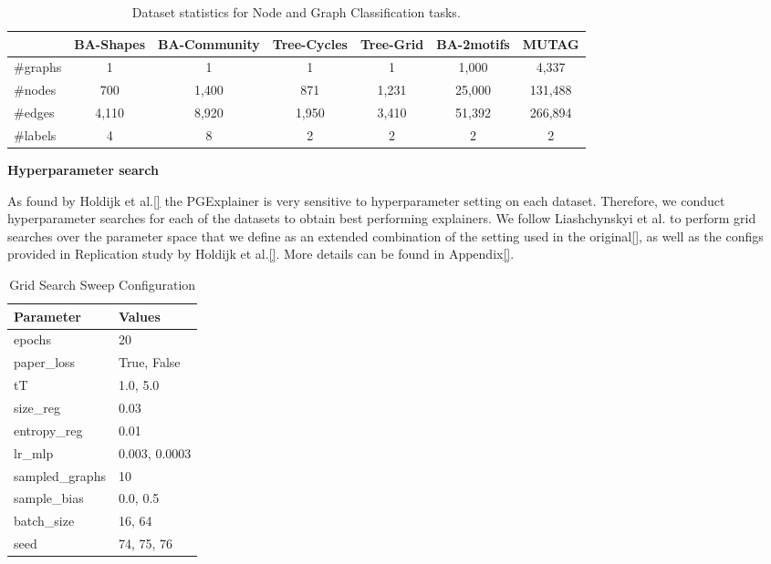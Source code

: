 \begin{table}[h]
    \centering
    \scriptsize
    \begin{tabular}{l|cccc|cc}
    \hline
    \textbf{} & \textbf{BA-Shapes} & \textbf{BA-Community} & \textbf{Tree-Cycles} & \textbf{Tree-Grid} & \textbf{BA-2motifs} & \textbf{MUTAG} \\
    \hline
    \#graphs & 1 & 1 & 1 & 1 & 1,000 & 4,337 \\
    \#nodes  & 700 & 1,400 & 871 & 1,231 & 25,000 & 131,488 \\
    \#edges  & 4,110 & 8,920 & 1,950 & 3,410 & 51,392 & 266,894 \\
    \#labels & 4 & 8 & 2 & 2 & 2 & 2 \\
    \hline
    \end{tabular}
    \caption{Dataset statistics for Node and Graph Classification tasks.}
    \label{tab:dataset-statistics}
    \end{table}

\bigskip


\textbf{Hyperparameter search}

As found by Holdijk et al.\ref{} the PGExplainer is very sensitive to hyperparameter setting on each dataset. Therefore, we conduct hyperparameter searches for each of the datasets to obtain best performing explainers. We follow Liashchynskyi et al. \cite{liashchynskyi2019grid} to perform grid searches over the parameter space that we define as an extended combination of the setting used in the original\ref{}, as well as the configs provided in Replication study by Holdijk et al.\ref{}. More details can be found in Appendix\ref{}.

\begin{table}[h!]
    \centering
    \begin{tabular}{|l|l|}
    \hline
    \textbf{Parameter} & \textbf{Values} \\ \hline
    epochs & 20 \\ \hline
    paper\_loss & True, False \\ \hline
    tT & 1.0, 5.0 \\ \hline
    size\_reg & 0.03 \\ \hline
    entropy\_reg & 0.01 \\ \hline
    lr\_mlp & 0.003, 0.0003 \\ \hline
    sampled\_graphs & 10 \\ \hline
    sample\_bias & 0.0, 0.5 \\ \hline
    batch\_size & 16, 64 \\ \hline
    seed & 74, 75, 76 \\ \hline
    \end{tabular}
    \caption{Grid Search Sweep Configuration}
    \label{tab:sweep_config}
\end{table}








